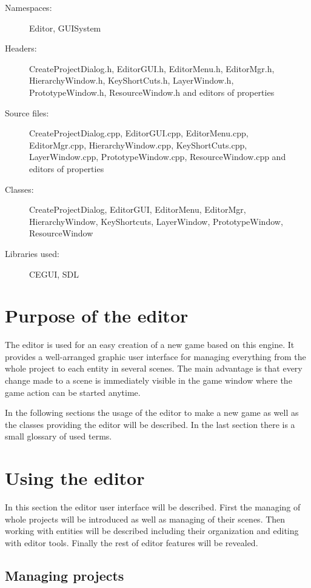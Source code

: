 \begin{description}
  \item[Namespaces:] Editor, GUISystem
  \item[Headers:] CreateProjectDialog.h, EditorGUI.h, EditorMenu.h, EditorMgr\-.h, HierarchyWindow.h, KeyShortCuts.h, LayerWindow.h, PrototypeWindow.h, ResourceWindow\-.h and e\-di\-tors of properties
  \item[Source files:] CreateProjectDialog.cpp, EditorGUI.cpp, EditorMenu.cpp,\\ EditorMgr.cpp, HierarchyWindow.cpp, KeyShortCuts.cpp, LayerWindow.cpp, PrototypeWindow\-.cpp, ResourceWindow.cpp and editors of properties
  \item[Classes:] CreateProjectDialog, EditorGUI, EditorMenu, EditorMgr, HierarchyWindow, KeyShortcuts, LayerWindow, PrototypeWindow, ResourceWindow
  \item[Libraries used:] CEGUI, SDL
\end{description}

\section{Purpose of the editor}

The editor is used for an easy creation of a new game based on this engine. It provides a well-arranged graphic user interface for managing everything from the whole project to each entity in several scenes. The main advantage is that every change made to a scene is immediately visible in the game window where the game action can be started anytime.

In the following sections the usage of the editor to make a new game as well as the classes providing the editor will be described. In the last section there is a small glossary of used terms.

\section{Using the editor}
\label{sec:editor-using}

In this section the editor user interface will be described. First the managing of whole projects will be introduced as well as managing of their scenes. Then working with entities will be described including their organization and editing with editor tools. Finally the rest of editor features will be revealed.

\subsection{Managing projects}

